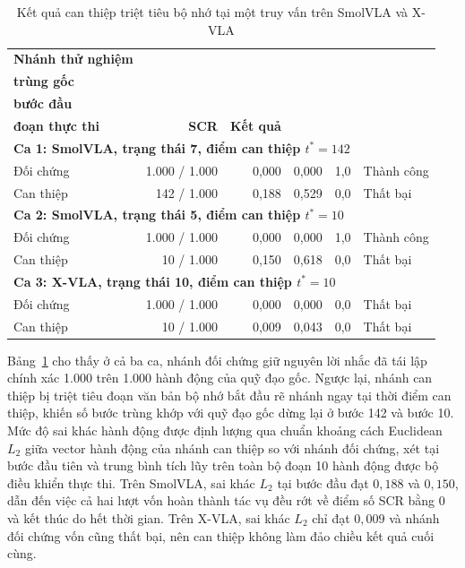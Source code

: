 \begin{table}[htbp]
\centering\small
\caption{Kết quả can thiệp triệt tiêu bộ nhớ tại một truy vấn trên SmolVLA và X-VLA}
\label{tab:e45-one-query}
\setlength{\tabcolsep}{3.5pt}
\begin{tabular}{l|r|r|r|c|l}
\toprule
\textbf{Nhánh thử nghiệm} & \shortstack{\textbf{Số bước}\\\textbf{trùng gốc}} & \shortstack{\textbf{Sai khác $L_2$}\\\textbf{bước đầu}} & \shortstack{\textbf{Sai khác $L_2$}\\\textbf{đoạn thực thi}} & \textbf{SCR} & \textbf{Kết quả} \\
\midrule
\multicolumn{6}{l}{\textbf{Ca 1: SmolVLA, trạng thái 7, điểm can thiệp $t^* = 142$ }} \\
\midrule
Đối chứng & 1.000 / 1.000 & 0,000 & 0,000 & 1,0 & Thành công \\
Can thiệp & 142 / 1.000   & 0,188 & 0,529 & 0,0 & Thất bại \\
\midrule
\multicolumn{6}{l}{\textbf{Ca 2: SmolVLA, trạng thái 5, điểm can thiệp $t^* = 10$ }} \\
\midrule
Đối chứng & 1.000 / 1.000 & 0,000 & 0,000 & 1,0 & Thành công \\
Can thiệp & 10 / 1.000    & 0,150 & 0,618 & 0,0 & Thất bại \\
\midrule
\multicolumn{6}{l}{\textbf{Ca 3: X-VLA, trạng thái 10, điểm can thiệp $t^* = 10$}} \\
\midrule
Đối chứng & 1.000 / 1.000 & 0,000 & 0,000 & 0,0 & Thất bại \\
Can thiệp & 10 / 1.000    & 0,009 & 0,043 & 0,0 & Thất bại \\
\bottomrule
\end{tabular}
\par\smallskip
\end{table}

Bảng~\ref{tab:e45-one-query} cho thấy ở cả ba ca, nhánh đối chứng giữ nguyên lời nhắc đã tái lập chính xác 1.000 trên 1.000 hành động của quỹ đạo gốc. Ngược lại, nhánh can thiệp bị triệt tiêu đoạn văn bản bộ nhớ bắt đầu rẽ nhánh ngay tại thời điểm can thiệp, khiến số bước trùng khớp với quỹ đạo gốc dừng lại ở bước 142 và bước 10. Mức độ sai khác hành động được định lượng qua chuẩn khoảng cách Euclidean $L_2$ giữa vector hành động của nhánh can thiệp so với nhánh đối chứng, xét tại bước đầu tiên và trung bình tích lũy trên toàn bộ đoạn 10 hành động được bộ điều khiển thực thi. Trên SmolVLA, sai khác $L_2$ tại bước đầu đạt $0{,}188$ và $0{,}150$, dẫn đến việc cả hai lượt vốn hoàn thành tác vụ đều rớt về điểm số SCR bằng 0 và kết thúc do hết thời gian. Trên X-VLA, sai khác $L_2$ chỉ đạt $0{,}009$ và nhánh đối chứng vốn cũng thất bại, nên can thiệp không làm đảo chiều kết quả cuối cùng.

